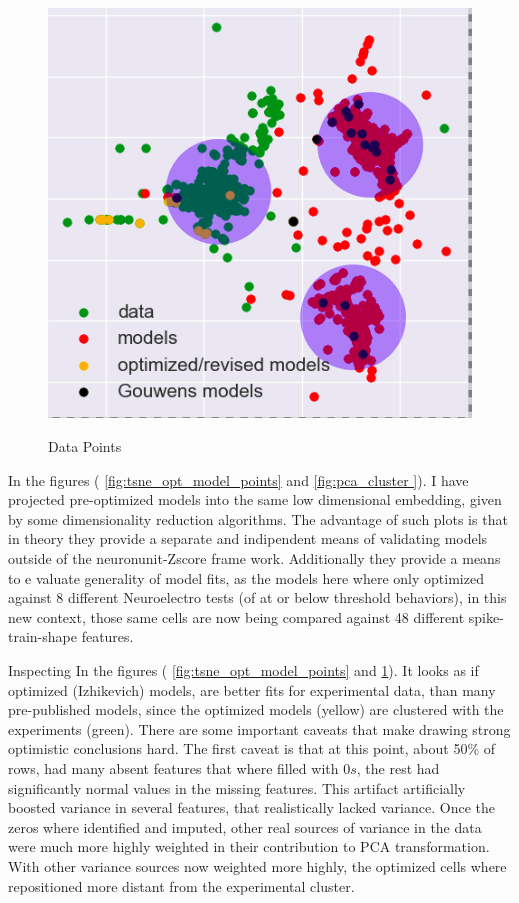 \begin{figure}    
\begin{center} \includegraphics[width=0.5\linewidth]{figures/data_experiment_fits.png}
    \label{fig:}
\end{center}
\caption[PCA clustering]{Data Points}
\label{fig:pca_cluster}
\end{figure}    


In the figures ( \ref{fig:tsne_opt_model_points} and \ref{fig:pca_cluster
}). I have projected pre-optimized models into the same low dimensional embedding, given by some dimensionality reduction algorithms. The advantage of such plots is that in theory they provide a separate and indipendent means of validating models outside of the neuronunit-Zscore frame work. Additionally they provide a means to e valuate generality of model fits, as the models here where only optimized against 8 different Neuroelectro tests (of at or below threshold behaviors), in this new context, those same cells are now being compared against 48 different spike-train-shape features.

Inspecting In the figures ( \ref{fig:tsne_opt_model_points} and \ref{fig:pca_cluster}). It looks as if optimized (Izhikevich) models, are better fits for experimental data, than many pre-published models, since the optimized models (yellow) are clustered with the experiments (green). There are some important caveats that make drawing strong optimistic conclusions hard. The first caveat is that at this point, about 50\% of rows, had many absent features that where filled with $0s$, the rest had significantly normal values in the missing features. This artifact artificially boosted variance in several features, that realistically lacked variance. Once the zeros where identified and imputed, other real sources of variance in the data were much more highly weighted in their contribution to PCA transformation. With other variance sources now weighted more highly, the optimized cells where repositioned more distant from the experimental cluster.

